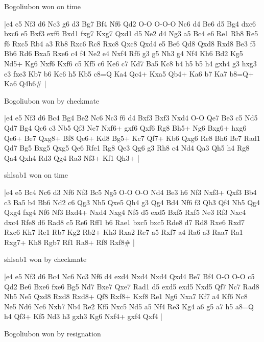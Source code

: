 \showboard

Bogoliubon won on time

\makegametitle
|e4 c5 Nf3 d6 Nc3 g6 d3 Bg7 Bf4 Nf6 Qd2 O-O O-O-O Nc6 d4 Be6 d5 Bg4 dxc6 bxc6 e5 Bxf3 exf6 Bxd1 fxg7 Kxg7 Qxd1 d5 Ne2 d4 Ng3 a5 Bc4 e6 Re1 Rb8 Re5 f6 Rxc5 Rb4 a3 Rb8 Rxc6 Rc8 Rxc8 Qxc8 Qxd4 e5 Be6 Qd8 Qxd8 Rxd8 Be3 f5 Bb6 Rd6 Bxa5 Rxe6 c4 f4 Ne2 e4 Nxf4 Rf6 g3 g5 Nh3 g4 Nf4 Kh6 Bd2 Kg5 Nd5+ Kg6 Nxf6 Kxf6 c5 Kf5 c6 Ke6 c7 Kd7 Ba5 Kc8 b4 h5 b5 h4 gxh4 g3 hxg3 e3 fxe3 Kb7 b6 Kc6 h5 Kb5 c8=Q Ka4 Qc4+ Kxa5 Qb4+ Ka6 b7 Ka7 b8=Q+ Ka6 Q4b6\#  |

\showboard

Bogoliubon won by checkmate

\makegametitle
|e4 e5 Nf3 d6 Bc4 Bg4 Be2 Nc6 Nc3 f6 d4 Bxf3 Bxf3 Nxd4 O-O Qe7 Be3 c5 Nd5 Qd7 Bg4 Qc6 c3 Nb5 Qf3 Ne7 Nxf6+ gxf6 Qxf6 Rg8 Bh5+ Ng6 Bxg6+ hxg6 Qe6+ Be7 Qxg8+ Bf8 Qe6+ Kd8 Bg5+ Kc7 Qf7+ Kb6 Qxg6 Re8 Bh6 Be7 Rad1 Qd7 Bg5 Bxg5 Qxg5 Qe6 Rfe1 Rg8 Qe3 Qg6 g3 Rh8 c4 Nd4 Qa3 Qh5 h4 Rg8 Qa4 Qxh4 Rd3 Qg4 Ra3 Nf3+ Kf1 Qh3+  |

\showboard

shlsab1 won on time

\makegametitle
|e4 e5 Bc4 Nc6 d3 Nf6 Nf3 Bc5 Ng5 O-O O-O Nd4 Be3 h6 Nf3 Nxf3+ Qxf3 Bb4 c3 Ba5 b4 Bb6 Nd2 c6 Qg3 Nh5 Qxe5 Qh4 g3 Qg4 Bd4 Nf6 f3 Qh3 Qf4 Nh5 Qg4 Qxg4 fxg4 Nf6 Nf3 Bxd4+ Nxd4 Nxg4 Nf5 d5 exd5 Bxf5 Rxf5 Ne3 Rf3 Nxc4 dxc4 Rfe8 d6 Rad8 c5 Re6 Rff1 b6 Rae1 bxc5 bxc5 Rde8 d7 Rd8 Rxe6 Rxd7 Rxc6 Kh7 Re1 Rb7 Kg2 Rb2+ Kh3 Rxa2 Re7 a5 Rxf7 a4 Ra6 a3 Raa7 Ra1 Rxg7+ Kh8 Rgb7 Rf1 Ra8+ Rf8 Rxf8\#  |

\showboard

shlsab1 won by checkmate

\makegametitle
|e4 e5 Nf3 d6 Bc4 Nc6 Nc3 Nf6 d4 exd4 Nxd4 Nxd4 Qxd4 Be7 Bf4 O-O O-O c5 Qd2 Be6 Bxe6 fxe6 Bg5 Nd7 Bxe7 Qxe7 Rad1 d5 exd5 exd5 Nxd5 Qf7 Nc7 Rad8 Nb5 Ne5 Qxd8 Rxd8 Rxd8+ Qf8 Rxf8+ Kxf8 Re1 Ng6 Nxa7 Kf7 a4 Kf6 Nc8 Ne5 Nd6 Nc6 Nxb7 Nb4 Re2 Kf5 Nxc5 Nd5 a5 Nf4 Re3 Kg4 a6 g5 a7 h5 a8=Q h4 Qf3+ Kf5 Nd3 h3 gxh3 Kg6 Nxf4+ gxf4 Qxf4  |

\showboard

Bogoliubon won by resignation

